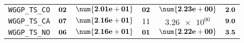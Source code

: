 \begin{table}[H]
\begin{tabularx}{\textwidth}{l||CC|CC||c}
		\texttt{WGGP\_TS\_CO} & $\bf 02$ & $\bf \num{2.01e+01}$ & $\bf 02$ & $\bf \num{2.23e+00}$ &$\bf 2.0$  \\
		\texttt{WGGP\_TS\_CA} & $\bf 07$ & $\bf \num{2.16e+01}$ & $ 11$ & $ \num{3.26e+00}$ &$\bf 9.0$  \\
		\texttt{WGGP\_TS\_NO} & $\bf 06$ & $\bf \num{2.16e+01}$ & $\bf 01$ & $\bf \num{2.22e+00}$ &$\bf 3.5$  \\
	\end{tabularx}
\end{table}
